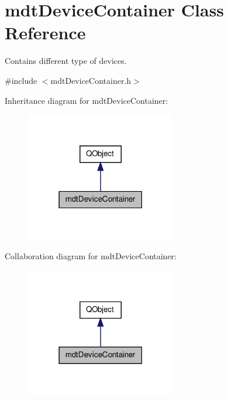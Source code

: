\hypertarget{classmdt_device_container}{\section{mdt\-Device\-Container Class Reference}
\label{classmdt_device_container}
}


Contains different type of devices.  




{\ttfamily \#include $<$mdt\-Device\-Container.\-h$>$}



Inheritance diagram for mdt\-Device\-Container\-:\nopagebreak
\begin{figure}[H]
\begin{center}
\leavevmode
\includegraphics[width=186pt]{classmdt_device_container__inherit__graph}
\end{center}
\end{figure}


Collaboration diagram for mdt\-Device\-Container\-:\nopagebreak
\begin{figure}[H]
\begin{center}
\leavevmode
\includegraphics[width=186pt]{classmdt_device_container__coll__graph}
\end{center}
\end{figure}
